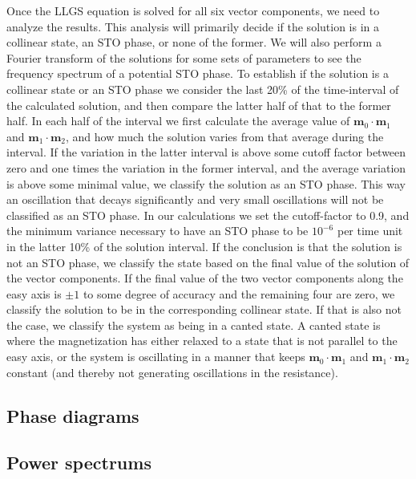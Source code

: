 Once the LLGS equation is solved for all six vector components, we need to analyze the results. This analysis will primarily decide if the solution is in a collinear state, an STO phase, or none of the former. We will also perform a Fourier transform of the solutions for some sets of parameters to see the frequency spectrum of a potential STO phase. To establish if the solution is a collinear state or an STO phase we consider the last 20\% of the time-interval of the calculated solution, and then compare the latter half of that to the former half. In each half of the interval we first calculate the average value of $\mathbold{m}_0\cdot\mathbold{m}_1$ and $\mathbold{m}_1\cdot\mathbold{m}_2$, and how much the solution varies from that average during the interval. If the variation in the latter interval is above some cutoff factor between zero and one times the variation in the former interval, and the average variation is above some minimal value, we classify the solution as an STO phase. This way an oscillation that decays significantly and very small oscillations will not be classified as an STO phase. In our calculations we set the cutoff-factor to 0.9, and the minimum variance necessary to have an STO phase to be $10^{-6}$ per time unit in the latter 10\% of the solution interval. If the conclusion is that the solution is not an STO phase, we classify the state based on the final value of the solution of the vector components. If the final value of the two vector components along the easy axis is $\pm1$ to some degree of accuracy and the remaining four are zero, we classify the solution to be in the corresponding collinear state. If that is also not the case, we classify the system as being in a canted state. A canted state is where the magnetization has either relaxed to a state that is not parallel to the easy axis, or the system is oscillating in a manner that keeps $\mathbold{m}_0\cdot\mathbold{m}_1$ and $\mathbold{m}_1\cdot\mathbold{m}_2$ constant (and thereby not generating oscillations in the resistance). 
\subsection{Phase diagrams}
\subsection{Power spectrums}